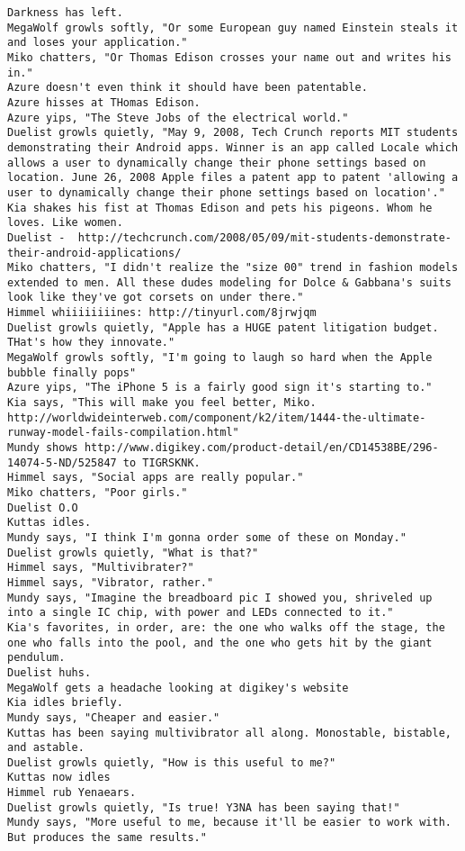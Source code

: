 \begin{verbatim}
Darkness has left.
MegaWolf growls softly, "Or some European guy named Einstein steals it and loses your application."
Miko chatters, "Or Thomas Edison crosses your name out and writes his in."
Azure doesn't even think it should have been patentable.
Azure hisses at THomas Edison.
Azure yips, "The Steve Jobs of the electrical world."
Duelist growls quietly, "May 9, 2008, Tech Crunch reports MIT students demonstrating their Android apps. Winner is an app called Locale which allows a user to dynamically change their phone settings based on location. June 26, 2008 Apple files a patent app to patent 'allowing a user to dynamically change their phone settings based on location'."
Kia shakes his fist at Thomas Edison and pets his pigeons. Whom he loves. Like women.
Duelist -  http://techcrunch.com/2008/05/09/mit-students-demonstrate-their-android-applications/
Miko chatters, "I didn't realize the "size 00" trend in fashion models extended to men. All these dudes modeling for Dolce & Gabbana's suits look like they've got corsets on under there."
Himmel whiiiiiiiines: http://tinyurl.com/8jrwjqm
Duelist growls quietly, "Apple has a HUGE patent litigation budget. THat's how they innovate."
MegaWolf growls softly, "I'm going to laugh so hard when the Apple bubble finally pops"
Azure yips, "The iPhone 5 is a fairly good sign it's starting to."
Kia says, "This will make you feel better, Miko. http://worldwideinterweb.com/component/k2/item/1444-the-ultimate-runway-model-fails-compilation.html"
Mundy shows http://www.digikey.com/product-detail/en/CD14538BE/296-14074-5-ND/525847 to TIGRSKNK.
Himmel says, "Social apps are really popular."
Miko chatters, "Poor girls."
Duelist O.O
Kuttas idles.
Mundy says, "I think I'm gonna order some of these on Monday."
Duelist growls quietly, "What is that?"
Himmel says, "Multivibrater?"
Himmel says, "Vibrator, rather."
Mundy says, "Imagine the breadboard pic I showed you, shriveled up into a single IC chip, with power and LEDs connected to it."
Kia's favorites, in order, are: the one who walks off the stage, the one who falls into the pool, and the one who gets hit by the giant pendulum.
Duelist huhs.
MegaWolf gets a headache looking at digikey's website
Kia idles briefly.
Mundy says, "Cheaper and easier."
Kuttas has been saying multivibrator all along. Monostable, bistable, and astable.
Duelist growls quietly, "How is this useful to me?"
Kuttas now idles
Himmel rub Yenaears.
Duelist growls quietly, "Is true! Y3NA has been saying that!"
Mundy says, "More useful to me, because it'll be easier to work with.  But produces the same results."

\end{verbatim}
